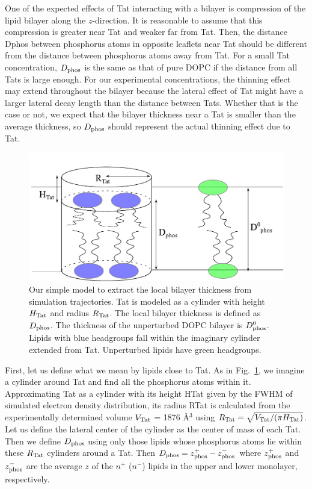 One of the expected effects of Tat interacting with a bilayer is 
compression of the lipid bilayer along the $z$-direction. It is 
reasonable to assume that this compression is greater near Tat and
weaker far from Tat.
Then, the distance \gls{Dphos} between phosphorus atoms in opposite
leaflets near Tat should be different from the distance between
phosphorus atoms away from Tat.  
For a small Tat concentration, $D_\text{phos}$ is the same as that of 
pure DOPC if the distance from all Tats is large enough.  
For our experimental concentrations, the thinning effect may extend throughout 
the bilayer because the lateral effect of Tat might have a larger lateral decay 
length than the distance between Tats. Whether that is the case or not, we 
expect that the bilayer thickness near a Tat is smaller than the average thickness,
so $D_\text{phos}$ should represent the actual thinning effect due to Tat. 

\begin{figure}[htbp]
  \centering
  \includegraphics[scale=0.7]{./figures/Tat/MMs/cylinder_model}
  \caption{Our simple model to extract the local bilayer thickness from 
  simulation trajectories. Tat is modeled as a cylinder with height $H_\textrm{Tat}$ 
  and radius $R_\textrm{Tat}$. The local bilayer thickness is defined as $D_\text{phos}$. 
  The thickness of the unperturbed DOPC bilayer is $D_\text{phos}^0$. 
  Lipids with blue headgroups fall within the imaginary cylinder extended from
  Tat. Unperturbed lipids have green headgroups.}
  \label{fig:cylinder_model}
\end{figure}
 
First, let us define what we mean by lipids close to Tat.  
As in Fig.~\ref{fig:cylinder_model}, we imagine a cylinder around Tat and 
find all the phosphorus atoms within it. 
Approximating Tat as a cylinder 
with its height \gls{HTat} given by the FWHM of simulated electron density distribution, 
its radius \gls{RTat} is calculated from the experimentally determined volume $V_\textrm{Tat}$ = 1876 \AA$^3$ 
using $R_\textrm{Tat}=\sqrt{V_\textrm{Tat}/(\pi H_\textrm{Tat})}$. 
Let us define the lateral center of the cylinder as the center of mass of each
Tat. Then we define $D_\text{phos}$ using only those lipids whose 
phosphorus atoms lie within these $R_\textrm{Tat}$ cylinders around a Tat. 
Then $D_\text{phos}= z_\textrm{phos}^+ - z_\textrm{phos}^-$ where $z_\textrm{phos}^+$ and $z_\textrm{phos}^-$ 
are the average $z$ of the $n^+$ ($n^-$) lipids in the upper and lower monolayer, respectively.  

